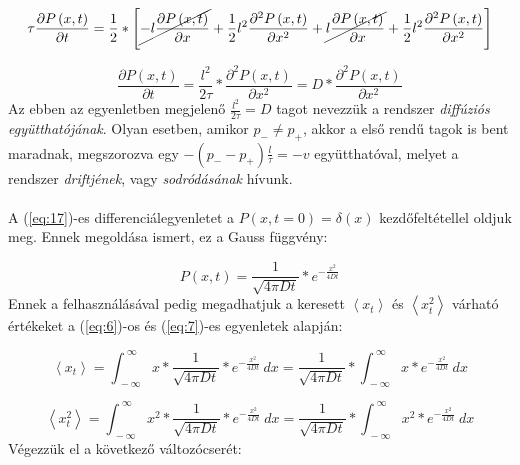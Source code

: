 \begin{equation} \label{eq:16}
    \tau \frac{\partial P \left( x, t \right)}{\partial t}
    =
    \frac{1}{2} * \left[ \cancel{-l \frac{\partial P \left( x, t \right)}{\partial x}} + \frac{1}{2} l^{2} \frac{\partial^{2} P \left( x, t \right)}{\partial x^{2}} + \cancel{l \frac{\partial P \left( x, t \right)}{\partial x}} + \frac{1}{2} l^{2} \frac{\partial^{2} P \left( x, t \right)}{\partial x^{2}} \right]
\end{equation}

\begin{equation} \label{eq:17}
    \frac{\partial P \left( x, t \right)}{\partial t} 
    =
    \frac{l^{2}}{2 \tau} * \frac{\partial^{2} P \left( x, t \right)}{\partial x^{2}}
    =
    D * \frac{\partial^{2} P \left( x, t \right)}{\partial x^{2}}
\end{equation}
Az ebben az egyenletben megjelenő $\frac{l^{2}}{2 \tau} = D$ tagot nevezzük a rendszer \emph{diffúziós együtthatójának}. Olyan esetben, amikor $p_{-} \neq p_{+}$, akkor a első rendű tagok is bent maradnak, megszorozva egy $- \left( p_{-} - p_{+} \right) \frac{l}{\tau} = - v$ együtthatóval, melyet a rendszer \emph{driftjének}, vagy \emph{sodródásának} hívunk.
\\ \\
A (\ref{eq:17})-es differenciálegyenletet a $P \left( x, t=0 \right) = \delta \left( x \right)$ kezdőfeltétellel oldjuk meg. Ennek megoldása ismert, ez a Gauss függvény:

\begin{equation} \label{eq:18}
    P \left( x, t \right) = \frac{1}{\sqrt{4 \pi D t}} * e^{-\tfrac{x^{2}}{4Dt}}
\end{equation}
Ennek a felhasználásával pedig megadhatjuk a keresett $\left< x_{t} \right>$ és $\left< x_{t}^{2} \right>$ várható értékeket a (\ref{eq:6})-os és (\ref{eq:7})-es egyenletek alapján:

\begin{equation} \label{eq:19}
    \left< x_{t} \right>
    =
    \int_{\ -\infty}^{\ \infty} x * \frac{1}{\sqrt{4 \pi D t}} * e^{-\tfrac{x^{2}}{4Dt}}\ dx
    =
    \frac{1}{\sqrt{4 \pi D t}} * \int_{\ -\infty}^{\ \infty} x * e^{-\tfrac{x^{2}}{4Dt}}\ dx
\end{equation}

\begin{equation} \label{eq:20}
    \left< x_{t}^{2} \right>
    =
    \int_{\ -\infty}^{\ \infty} x^{2} * \frac{1}{\sqrt{4 \pi D t}} * e^{-\tfrac{x^{2}}{4Dt}}\ dx
    =
    \frac{1}{\sqrt{4 \pi D t}} * \int_{\ -\infty}^{\ \infty} x^{2} * e^{-\tfrac{x^{2}}{4Dt}}\ dx
\end{equation}
Végezzük el a következő változócserét:

